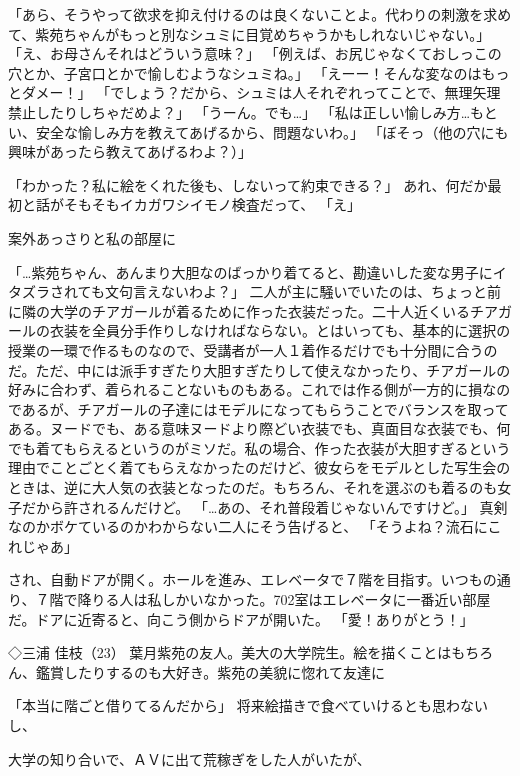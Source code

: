 「あら、そうやって欲求を抑え付けるのは良くないことよ。代わりの刺激を求めて、紫苑ちゃんがもっと別なシュミに目覚めちゃうかもしれないじゃない。」
「え、お母さんそれはどういう意味？」
「例えば、お尻じゃなくておしっこの穴とか、子宮口とかで愉しむようなシュミね。」
「えーー！そんな変なのはもっとダメー！」
「でしょう？だから、シュミは人それぞれってことで、無理矢理禁止したりしちゃだめよ？」
「うーん。でも…」
「私は正しい愉しみ方…もとい、安全な愉しみ方を教えてあげるから、問題ないわ。」
「ぼそっ（他の穴にも興味があったら教えてあげるわよ？）」



「わかった？私に絵をくれた後も、しないって約束できる？」
あれ、何だか最初と話がそもそもイカガワシイモノ検査だって、
「え」


案外あっさりと私の部屋に




「…紫苑ちゃん、あんまり大胆なのばっかり着てると、勘違いした変な男子にイタズラされても文句言えないわよ？」
二人が主に騒いでいたのは、ちょっと前に隣の大学のチアガールが着るために作った衣装だった。二十人近くいるチアガールの衣装を全員分手作りしなければならない。とはいっても、基本的に選択の授業の一環で作るものなので、受講者が一人１着作るだけでも十分間に合うのだ。ただ、中には派手すぎたり大胆すぎたりして使えなかったり、チアガールの好みに合わず、着られることないものもある。これでは作る側が一方的に損なのであるが、チアガールの子達にはモデルになってもらうことでバランスを取ってある。ヌードでも、ある意味ヌードより際どい衣装でも、真面目な衣装でも、何でも着てもらえるというのがミソだ。私の場合、作った衣装が大胆すぎるという理由でことごとく着てもらえなかったのだけど、彼女らをモデルとした写生会のときは、逆に大人気の衣装となったのだ。もちろん、それを選ぶのも着るのも女子だから許されるんだけど。
「…あの、それ普段着じゃないんですけど。」
真剣なのかボケているのかわからない二人にそう告げると、
「そうよね？流石にこれじゃあ」



され、自動ドアが開く。ホールを進み、エレベータで７階を目指す。いつもの通り、７階で降りる人は私しかいなかった。702室はエレベータに一番近い部屋だ。ドアに近寄ると、向こう側からドアが開いた。
「愛！ありがとう！」

◇三浦 佳枝（23）
葉月紫苑の友人。美大の大学院生。絵を描くことはもちろん、鑑賞したりするのも大好き。紫苑の美貌に惚れて友達に


「本当に階ごと借りてるんだから」
将来絵描きで食べていけるとも思わないし、


大学の知り合いで、ＡＶに出て荒稼ぎをした人がいたが、



